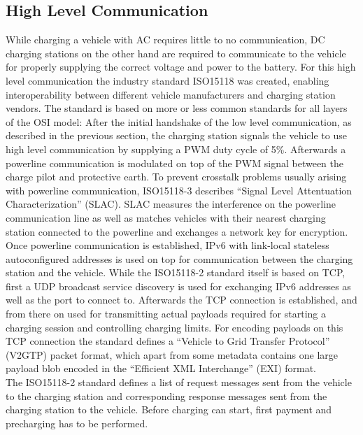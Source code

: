 \documentclass[conference,flushend]{iaria} %
\begin{document}
\subsection{High Level Communication} \label{sec:highlevelcomm}
While charging a vehicle with AC requires little to no communication,
DC charging stations on the other hand are required to communicate to the vehicle for properly supplying the correct voltage and power to the battery.
For this high level communication the industry standard ISO15118 \cite{isoiec_isoiec_2012} was created, enabling interoperability between different vehicle manufacturers and charging station vendors.
The standard is based on more or less common standards for all layers of the OSI model:
After the initial handshake of the low level communication, as described in the previous section, the charging station signals the vehicle to use high level communication by supplying a PWM duty cycle of 5\%.
Afterwards a powerline communication is modulated on top of the PWM signal between the charge pilot and protective earth.
To prevent crosstalk problems \cite{li_crosstalk_2019, theethayi_parameters_2003, ngo_bisse_crosstalk_2023} usually arising with powerline communication, ISO15118-3 \cite{isoiec_isoiec_2012-1} describes \enquote{Signal Level Attentuation Characterization} (SLAC).
SLAC measures the interference on the powerline communication line as well as matches vehicles with their nearest charging station connected to the powerline and exchanges a network key for encryption.
Once powerline communication is established, IPv6 with link-local stateless autoconfigured addresses is used on top for communication between the charging station and the vehicle.
While the ISO15118-2 standard \cite{isoiec_isoiec_2012} itself is based on TCP, first a UDP broadcast service discovery is used for exchanging IPv6 addresses as well as the port to connect to.
Afterwards the TCP connection is established, and from there on used for transmitting actual payloads required for starting a charging session and controlling charging limits.
For encoding payloads on this TCP connection the standard defines a \enquote{Vehicle to Grid Transfer Protocol} (V2GTP) packet format, which apart from some metadata contains one large payload blob encoded in the \enquote{Efficient XML Interchange} (EXI) format. \\
The ISO15118-2 standard defines a list of request messages sent from the vehicle to the charging station and corresponding response messages sent from the charging station to the vehicle.
Before charging can start, first payment and precharging has to be performed.
\end{document}
